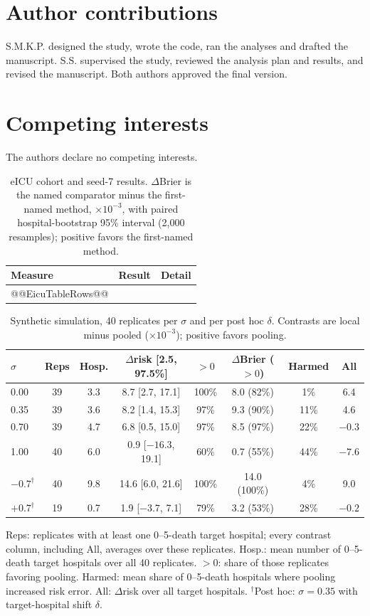 \documentclass[11pt]{article}
\begin{document}
\section*{Author contributions}
S.M.K.P. designed the study, wrote the code, ran the analyses and drafted the manuscript. S.S. supervised the study, reviewed the analysis plan and results, and revised the manuscript. Both authors approved the final version.

\section*{Competing interests}
The authors declare no competing interests.

\clearpage
\begin{table}[p]
\caption{eICU cohort and seed-7 results. $\Delta$Brier is the named comparator minus the first-named method, $\times10^{-3}$, with paired hospital-bootstrap 95\% interval (2,000 resamples); positive favors the first-named method.}
\label{tab:eicu}
\centering\footnotesize
\begin{tabularx}{\textwidth}{@{}p{}p{}X@{}}
\toprule
Measure & Result & Detail \\
\midrule
@@EicuTableRows@@
\bottomrule
\end{tabularx}
\end{table}

\begin{table}[p]
\caption{Synthetic simulation, 40 replicates per $\sigma$ and per post hoc $\delta$. Contrasts are local minus pooled ($\times10^{-3}$); positive favors pooling.}
\label{tab:sim}
\centering\footnotesize
\setlength{\tabcolsep}{2.2pt}
\begin{tabular}{@{}lccccccc@{}}
\toprule
$\sigma$ & Reps & Hosp. & $\Delta$risk [2.5, 97.5\%] & $>0$ & $\Delta$Brier ($>0$) & Harmed & All \\
\midrule
0.00 & 39 & 3.3 & 8.7 [2.7, 17.1] & 100\% & 8.0 (82\%) & 1\% & 6.4 \\
0.35 & 39 & 3.6 & 8.2 [1.4, 15.3] & 97\% & 9.3 (90\%) & 11\% & 4.6 \\
0.70 & 39 & 4.7 & 6.8 [0.5, 15.0] & 97\% & 8.5 (97\%) & 22\% & $-0.3$ \\
1.00 & 40 & 6.0 & 0.9 [$-16.3$, 19.1] & 60\% & 0.7 (55\%) & 44\% & $-7.6$ \\
\midrule
$-0.7^\dagger$ & 40 & 9.8 & 14.6 [6.0, 21.6] & 100\% & 14.0 (100\%) & 4\% & 9.0 \\
$+0.7^\dagger$ & 19 & 0.7 & 1.9 [$-3.7$, 7.1] & 79\% & 3.2 (53\%) & 28\% & $-0.2$ \\
\bottomrule
\end{tabular}

\vspace{2pt}
{\scriptsize Reps: replicates with at least one 0--5-death target hospital; every contrast column, including All, averages over these replicates. Hosp.: mean number of 0--5-death target hospitals over all 40 replicates. $>0$: share of those replicates favoring pooling. Harmed: mean share of 0--5-death hospitals where pooling increased risk error. All: $\Delta$risk over all target hospitals. $^\dagger$Post hoc: $\sigma=0.35$ with target-hospital shift $\delta$.}
\end{table}
\end{document}

